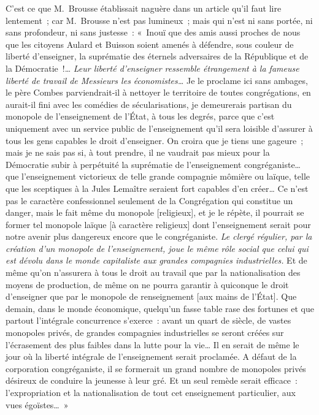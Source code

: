 \documentclass[french,twoside]{book} %
\begin{document}
C’est ce que M. Brousse établissait naguère dans un article qu’il faut lire lentement ; car M. Brousse n’est pas lumineux ; mais qui n’est ni sans portée, ni sans profondeur, ni sans justesse : « Inouï que des amis aussi proches de nous que les citoyens Aulard et Buisson soient amenés à défendre, sous couleur de liberté d’enseigner, la suprématie des éternels adversaires de la République et de la Démocratie !… {\itshape Leur liberté d’enseigner ressemble étrangement à la fameuse liberté de travail de Messieurs les économistes…} Je le proclame ici sans  ambages, le père Combes parviendrait-il à nettoyer le territoire de toutes congrégations, en aurait-il fini avec les comédies de sécularisations, je demeurerais partisan du monopole de l’enseignement de l’État, à tous les degrés, parce que c’est uniquement avec un service public de l’enseignement qu’il sera loisible d’assurer à tous les gens capables le droit d’enseigner. On croira que je tiens une gageure ; mais je ne sais pas si, à tout prendre, il ne vaudrait pas mieux pour la Démocratie subir à perpétuité la suprématie de l’enseignement congréganiste… que l’enseignement victorieux de telle grande compagnie mômière ou laïque, telle que les sceptiques à la Jules Lemaître seraient fort capables d’en créer… Ce n’est pas le caractère confessionnel seulement de la Congrégation qui constitue un danger, mais le fait même du monopole [religieux], et je le répète, il pourrait se former tel monopole laïque [à caractère religieux] dont l’enseignement serait pour notre avenir plus dangereux encore que le congréganiste. {\itshape Le clergé régulier, par la création d’un monopole de l’enseignement, joue le même rôle social que celui qui est dévolu dans le monde capitaliste aux grandes compagnies industrielles.} Et de même qu’on n’assurera à tous le droit au travail que par la nationalisation des moyens de production, de même on ne  pourra garantir à quiconque le droit d’enseigner que par le monopole de renseignement [aux mains de l’État]. Que demain, dans le monde économique, quelqu’un fasse table rase des fortunes et que partout l’intégrale concurrence s’exerce : avant un quart de siècle, de vastes monopoles privés, de grandes compagnies industrielles se seront créées sur l’écrasement des plus faibles dans la lutte pour la vie… Il en serait de même le jour où la liberté intégrale de l’enseignement serait proclamée. A défaut de la corporation congréganiste, il se formerait un grand nombre de monopoles privés désireux de conduire la jeunesse à leur gré. Et un seul remède serait efficace : l’expropriation et la nationalisation de tout cet enseignement particulier, aux vues égoïstes… »\par
\end{document}
